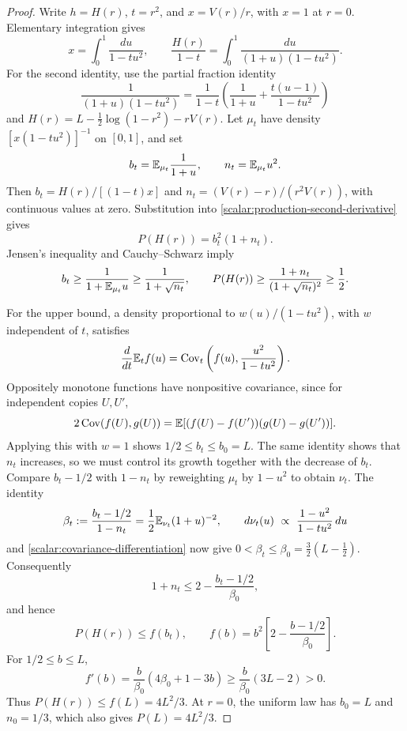 \begin{proof}
Write $h=H(r)$, $t=r^2$, and $x=V(r)/r$, with $x=1$ at
$r=0$.  Elementary integration gives
\begin{equation}
\label{scalar:entropy-moment-integrals}
 x=\int_0^1\frac{du}{1-tu^2},\qquad
 \frac{H(r)}{1-t}=\int_0^1\frac{du}{(1+u)(1-tu^2)}.
\end{equation}
For the second identity, use the partial fraction identity
\[
 \frac1{(1+u)(1-tu^2)}
 =\frac1{1-t}\left(\frac1{1+u}+\frac{t(u-1)}{1-tu^2}\right)
\]
and $H(r)=L-\frac12\log(1-r^2)-rV(r)$.
Let $\mu_t$ have density $[x(1-tu^2)]^{-1}$ on $[0,1]$, and set
\[
 b_t=\mathbb E_{\mu_t}\frac1{1+u},\qquad n_t=\mathbb E_{\mu_t}u^2.
\]
Then $b_t=H(r)/[(1-t)x]$ and
$n_t=(V(r)-r)/(r^2V(r))$, with continuous values at zero.
Substitution into \eqref{scalar:production-second-derivative} gives
\[
 P(H(r))=b_t^2(1+n_t).
\]
Jensen's inequality and Cauchy--Schwarz imply
\[
 b_t\ge\frac1{1+\mathbb E_{\mu_t}u}\ge\frac1{1+\sqrt{n_t}},
 \qquad
 P(H(r))\ge\frac{1+n_t}{(1+\sqrt{n_t})^2}\ge\frac12.
\]

For the upper bound, a density proportional to $w(u)/(1-tu^2)$,
with $w$ independent of $t$, satisfies
\begin{equation}
\label{scalar:covariance-differentiation}
 \frac{d}{dt}\mathbb E_t f(u)
 =\operatorname{Cov}_t\left(f(u),\frac{u^2}{1-tu^2}\right).
\end{equation}
Oppositely monotone functions have nonpositive covariance, since
for independent copies $U,U'$,
\[
 2\operatorname{Cov}(f(U),g(U))
 =\mathbb E[(f(U)-f(U'))(g(U)-g(U'))].
\]
Applying this with $w=1$ shows $1/2\le b_t\le b_0=L$.
The same identity shows that $n_t$ increases, so we must control
its growth together with the decrease of $b_t$.  Compare
$b_t-1/2$ with $1-n_t$ by reweighting $\mu_t$ by $1-u^2$
to obtain $\nu_t$.  The identity
\[
 \beta_t:=\frac{b_t-1/2}{1-n_t}
 =\frac12\mathbb E_{\nu_t}(1+u)^{-2},\qquad
 d\nu_t(u)\ \propto\ \frac{1-u^2}{1-tu^2}\,du
\]
and \eqref{scalar:covariance-differentiation} now give
$0<\beta_t\le\beta_0=\frac32(L-\frac12)$.
Consequently
\[
 1+n_t\le2-\frac{b_t-1/2}{\beta_0},
\]
and hence
\[
 P(H(r))\le f(b_t),\qquad
 f(b)=b^2\left[2-\frac{b-1/2}{\beta_0}\right].
\]
For $1/2\le b\le L$,
\[
 f'(b)=\frac b{\beta_0}(4\beta_0+1-3b)
 \ge\frac b{\beta_0}(3L-2)>0.
\]
Thus $P(H(r))\le f(L)=4L^2/3$.
At $r=0$, the uniform law has $b_0=L$ and $n_0=1/3$, which
also gives $P(L)=4L^2/3$.
\end{proof}
